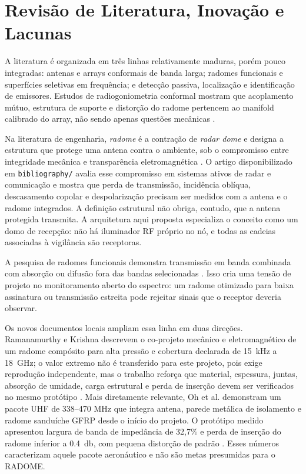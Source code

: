 \chapter{Revisão de Literatura, Inovação e Lacunas}

A literatura é organizada em três linhas relativamente maduras, porém pouco integradas: antenas e arrays conformais de banda larga; radomes funcionais e superfícies seletivas em frequência; e detecção passiva, localização e identificação de emissores. Estudos de radiogoniometria conformal mostram que acoplamento mútuo, estrutura de suporte e distorção do radome pertencem ao manifold calibrado do array, não sendo apenas questões mecânicas \cite{caratelli2011,liberal2011}.

Na literatura de engenharia, \emph{radome} é a contração de \emph{radar dome} e designa a estrutura que protege uma antena contra o ambiente, sob o compromisso entre integridade mecânica e transparência eletromagnética \cite{qamar2020}. O artigo disponibilizado em \texttt{bibliography/} avalia esse compromisso em sistemas ativos de radar e comunicação e mostra que perda de transmissão, incidência oblíqua, descasamento copolar e despolarização precisam ser medidos com a antena e o radome integrados. A definição estrutural não obriga, contudo, que a antena protegida transmita. A arquitetura aqui proposta especializa o conceito como um domo de recepção: não há iluminador RF próprio no nó, e todas as cadeias associadas à vigilância são receptoras.

A pesquisa de radomes funcionais demonstra transmissão em banda combinada com absorção ou difusão fora das bandas selecionadas \cite{costa2012,lv2021,omar2018,sheng2024}. Isso cria uma tensão de projeto no monitoramento aberto do espectro: um radome otimizado para baixa assinatura ou transmissão estreita pode rejeitar sinais que o receptor deveria observar.

Os novos documentos locais ampliam essa linha em duas direções. Ramanamurthy e Krishna descrevem o co-projeto mecânico e eletromagnético de um radome compósito para alta pressão e cobertura declarada de \SI{15}{\kilo\hertz} a \SI{18}{\giga\hertz}; o valor extremo não é transferido para este projeto, pois exige reprodução independente, mas o trabalho reforça que material, espessura, juntas, absorção de umidade, carga estrutural e perda de inserção devem ser verificados no mesmo protótipo \cite{ramanamurthy2016}. Mais diretamente relevante, Oh et al. demonstram um pacote UHF de 338--470 MHz que integra antena, parede metálica de isolamento e radome sanduíche GFRP desde o início do projeto. O protótipo medido apresentou largura de banda de impedância de 32,7\% e perda de inserção do radome inferior a \SI{0.4}{\decibel}, com pequena distorção de padrão \cite{oh2026}. Esses números caracterizam aquele pacote aeronáutico e não são metas presumidas para o RADOME.

